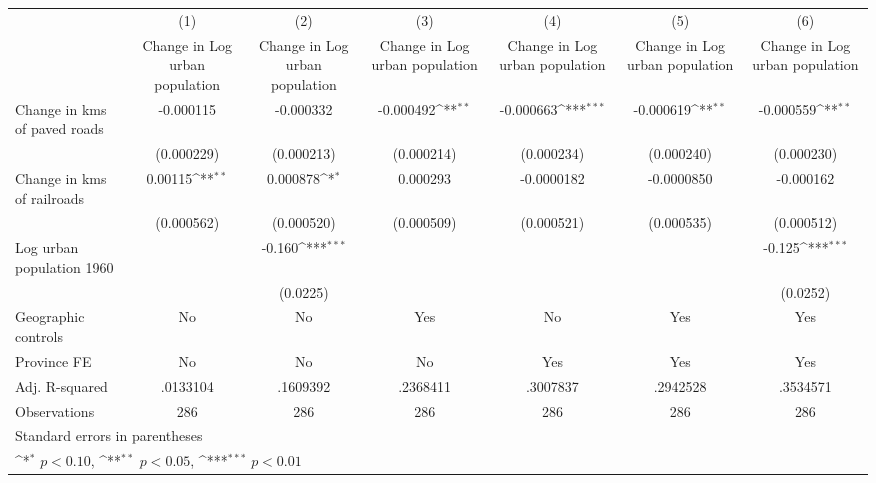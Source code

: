 {
\def\sym#1{\ifmmode^{#1}\else\(^{#1}\)\fi}
\begin{tabular}{l*{6}{c}}
\hline\hline
                    &\multicolumn{1}{c}{(1)}&\multicolumn{1}{c}{(2)}&\multicolumn{1}{c}{(3)}&\multicolumn{1}{c}{(4)}&\multicolumn{1}{c}{(5)}&\multicolumn{1}{c}{(6)}\\
                    &\multicolumn{1}{c}{Change in Log urban population}&\multicolumn{1}{c}{Change in Log urban population}&\multicolumn{1}{c}{Change in Log urban population}&\multicolumn{1}{c}{Change in Log urban population}&\multicolumn{1}{c}{Change in Log urban population}&\multicolumn{1}{c}{Change in Log urban population}\\
\hline
Change in kms of paved roads&   -0.000115         &   -0.000332         &   -0.000492\sym{**} &   -0.000663\sym{***}&   -0.000619\sym{**} &   -0.000559\sym{**} \\
                    &  (0.000229)         &  (0.000213)         &  (0.000214)         &  (0.000234)         &  (0.000240)         &  (0.000230)         \\
[1em]
Change in kms of railroads&     0.00115\sym{**} &    0.000878\sym{*}  &    0.000293         &  -0.0000182         &  -0.0000850         &   -0.000162         \\
                    &  (0.000562)         &  (0.000520)         &  (0.000509)         &  (0.000521)         &  (0.000535)         &  (0.000512)         \\
[1em]
Log urban population 1960&                     &      -0.160\sym{***}&                     &                     &                     &      -0.125\sym{***}\\
                    &                     &    (0.0225)         &                     &                     &                     &    (0.0252)         \\
\hline
Geographic controls &          No         &          No         &         Yes         &          No         &         Yes         &         Yes         \\
Province FE         &          No         &          No         &          No         &         Yes         &         Yes         &         Yes         \\
Adj. R-squared      &    .0133104         &    .1609392         &    .2368411         &    .3007837         &    .2942528         &    .3534571         \\
Observations        &         286         &         286         &         286         &         286         &         286         &         286         \\
\hline\hline
\multicolumn{7}{l}{\footnotesize Standard errors in parentheses}\\
\multicolumn{7}{l}{\footnotesize \sym{*} \(p<0.10\), \sym{**} \(p<0.05\), \sym{***} \(p<0.01\)}\\
\end{tabular}
}
